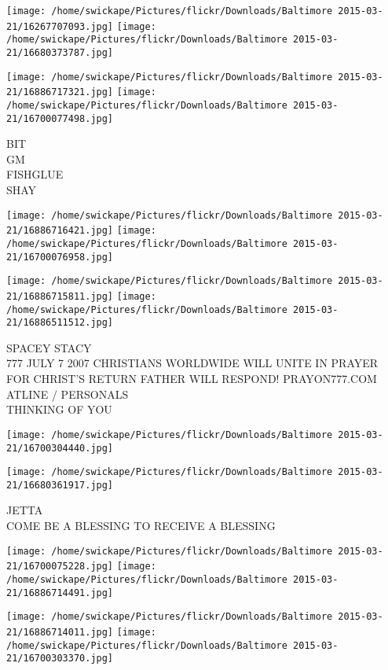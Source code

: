 \documentclass[10pt,letterpaper]{article}
\begin{document}
\texttt{[image: /home/swickape/Pictures/flickr/Downloads/Baltimore 2015-03-21/16267707093.jpg]}
\texttt{[image: /home/swickape/Pictures/flickr/Downloads/Baltimore 2015-03-21/16680373787.jpg]}

\texttt{[image: /home/swickape/Pictures/flickr/Downloads/Baltimore 2015-03-21/16886717321.jpg]}
\texttt{[image: /home/swickape/Pictures/flickr/Downloads/Baltimore 2015-03-21/16700077498.jpg]}

BIT\\
GM\\
FISHGLUE\\
SHAY
\pagebreak

\texttt{[image: /home/swickape/Pictures/flickr/Downloads/Baltimore 2015-03-21/16886716421.jpg]}
\texttt{[image: /home/swickape/Pictures/flickr/Downloads/Baltimore 2015-03-21/16700076958.jpg]}

\texttt{[image: /home/swickape/Pictures/flickr/Downloads/Baltimore 2015-03-21/16886715811.jpg]}
\texttt{[image: /home/swickape/Pictures/flickr/Downloads/Baltimore 2015-03-21/16886511512.jpg]}

SPACEY STACY\\
777 JULY 7 2007 CHRISTIANS WORLDWIDE WILL UNITE IN PRAYER FOR CHRIST'S RETURN FATHER WILL RESPOND! PRAYON777.COM\\
ATLINE / PERSONALS\\
THINKING OF YOU
\pagebreak

\texttt{[image: /home/swickape/Pictures/flickr/Downloads/Baltimore 2015-03-21/16700304440.jpg]}

\vspace{0.25in}
\texttt{[image: /home/swickape/Pictures/flickr/Downloads/Baltimore 2015-03-21/16680361917.jpg]}

JETTA\\
COME BE A BLESSING TO RECEIVE A BLESSING
\pagebreak

\texttt{[image: /home/swickape/Pictures/flickr/Downloads/Baltimore 2015-03-21/16700075228.jpg]}
\texttt{[image: /home/swickape/Pictures/flickr/Downloads/Baltimore 2015-03-21/16886714491.jpg]}

\texttt{[image: /home/swickape/Pictures/flickr/Downloads/Baltimore 2015-03-21/16886714011.jpg]}
\texttt{[image: /home/swickape/Pictures/flickr/Downloads/Baltimore 2015-03-21/16700303370.jpg]}
\end{document}
